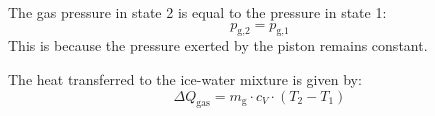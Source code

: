 The gas pressure in state 2 is equal to the pressure in state 1:  
\[
p_{\text{g,2}} = p_{\text{g,1}}
\]  
This is because the pressure exerted by the piston remains constant.  

The heat transferred to the ice-water mixture is given by:  
\[
\Delta Q_{\text{gas}} = m_{\text{g}} \cdot c_V \cdot (T_2 - T_1)
\]